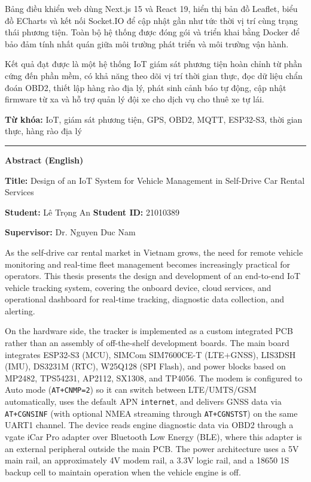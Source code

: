 \documentclass[13pt,a4paper]{extarticle}
\renewcommand{\\}{\thesislongtableorignewline\hline}%
\newcommand{\thesisspacer}{\hspace{2em}}
\begin{document}
Bảng điều khiển web dùng Next.js 15 và React 19, hiển thị bản đồ
Leaflet, biểu đồ ECharts và kết nối Socket.IO để cập nhật gần như tức
thời vị trí cùng trạng thái phương tiện. Toàn bộ hệ thống được đóng gói
và triển khai bằng Docker để bảo đảm tính nhất quán giữa môi trường phát
triển và môi trường vận hành.

Kết quả đạt được là một hệ thống IoT giám sát phương tiện hoàn chỉnh từ
phần cứng đến phần mềm, có khả năng theo dõi vị trí thời gian thực, đọc
dữ liệu chẩn đoán OBD2, thiết lập hàng rào địa lý, phát sinh cảnh báo tự
động, cập nhật firmware từ xa và hỗ trợ quản lý đội xe cho dịch vụ cho
thuê xe tự lái.

\textbf{Từ khóa:} IoT, giám sát phương tiện, GPS, OBD2, MQTT, ESP32-S3,
thời gian thực, hàng rào địa lý

\begin{center}\rule{0.5\linewidth}{0.5pt}\end{center}

\textbf{Abstract (English)}

\textbf{Title:} Design of an IoT System for Vehicle Management in
Self-Drive Car Rental Services

\textbf{Student:} Lê Trọng An \thesisspacer \textbf{Student ID:} 21010389

\textbf{Supervisor:} Dr. Nguyen Duc Nam

As the self-drive car rental market in Vietnam grows, the need for
remote vehicle monitoring and real-time fleet management becomes
increasingly practical for operators. This thesis presents the design
and development of an end-to-end IoT vehicle tracking system, covering
the onboard device, cloud services, and operational dashboard for
real-time tracking, diagnostic data collection, and alerting.

On the hardware side, the tracker is implemented as a custom integrated
PCB rather than an assembly of off-the-shelf development boards. The
main board integrates ESP32-S3 (MCU), SIMCom SIM7600CE-T (LTE+GNSS),
LIS3DSH (IMU), DS3231M (RTC), W25Q128 (SPI Flash), and power blocks based
on MP2482, TPS54231, AP2112, SX1308, and TP4056. The modem is configured
to Auto mode (\texttt{AT+CNMP=2}) so it can switch between LTE/UMTS/GSM
automatically, uses the default APN \texttt{internet}, and delivers GNSS
data via \texttt{AT+CGNSINF} (with optional NMEA streaming through
\texttt{AT+CGNSTST}) on the same UART1 channel. The device reads engine
diagnostic data via OBD2 through a vgate iCar Pro adapter over Bluetooth
Low Energy (BLE), where this adapter is an external peripheral outside
the main PCB. The power architecture uses a 5V main rail, an
approximately 4V modem rail, a 3.3V logic rail, and a 18650 1S backup
cell to maintain operation when the vehicle engine is off.
\end{document}
